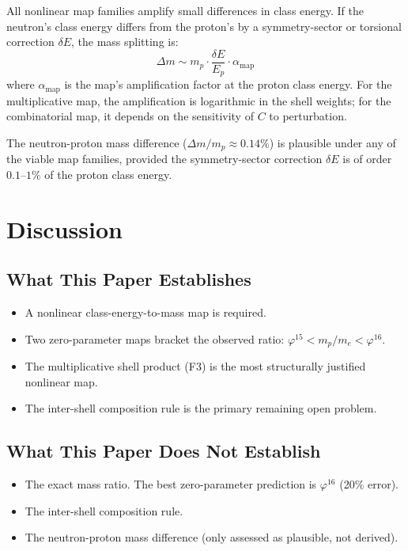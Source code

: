\documentclass[12pt]{article}
\newcommand{\phig}{\varphi}
\begin{document}
All nonlinear map families amplify small differences in class energy. If the neutron's class energy differs from the proton's by a symmetry-sector or torsional correction $\delta E$, the mass splitting is:
\begin{equation}
    \Delta m \sim m_p \cdot \frac{\delta E}{E_p} \cdot \alpha_{\mathrm{map}}
\end{equation}
where $\alpha_{\mathrm{map}}$ is the map's amplification factor at the proton class energy. For the multiplicative map, the amplification is logarithmic in the shell weights; for the combinatorial map, it depends on the sensitivity of $C$ to perturbation.

The neutron-proton mass difference ($\Delta m / m_p \approx 0.14\%$) is plausible under any of the viable map families, provided the symmetry-sector correction $\delta E$ is of order $0.1$--$1\%$ of the proton class energy.

\section{Discussion}\label{sec:discussion}

\subsection{What This Paper Establishes}

\begin{itemize}
    \item A nonlinear class-energy-to-mass map is required.
    \item Two zero-parameter maps bracket the observed ratio: $\phig^{15} < m_p/m_e < \phig^{16}$.
    \item The multiplicative shell product (F3) is the most structurally justified nonlinear map.
    \item The inter-shell composition rule is the primary remaining open problem.
\end{itemize}

\subsection{What This Paper Does Not Establish}

\begin{itemize}
    \item The exact mass ratio. The best zero-parameter prediction is $\phig^{16}$ (20\% error).
    \item The inter-shell composition rule.
    \item The neutron-proton mass difference (only assessed as plausible, not derived).
\end{itemize}
\end{document}
